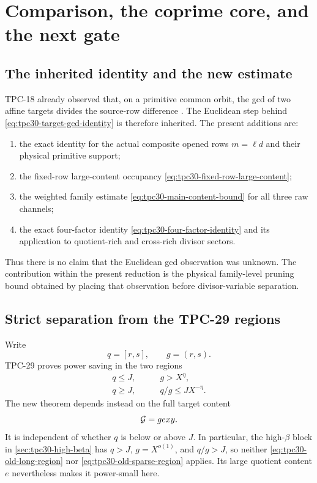 \section{Comparison, the coprime core, and the next gate}
\label{sec:tpc30-comparison}

\subsection{The inherited identity and the new estimate}

TPC-18 already observed that, on a primitive common orbit, the gcd of
two affine targets divides the source-row difference
\citep{WangTPC18}.  The Euclidean step behind
\eqref{eq:tpc30-target-gcd-identity} is therefore inherited.  The
present additions are:
\begin{enumerate}[label=\textup{(\roman*)}]
 \item the exact identity for the actual composite opened rows
 $m=\ell d$ and their physical primitive support;
 \item the fixed-row large-content occupancy
 \eqref{eq:tpc30-fixed-row-large-content};
 \item the weighted family estimate
 \eqref{eq:tpc30-main-content-bound} for all three raw channels;
 \item the exact four-factor identity
 \eqref{eq:tpc30-four-factor-identity} and its application to
 quotient-rich and cross-rich divisor sectors.
\end{enumerate}
Thus there is no claim that the Euclidean gcd observation was unknown.
The contribution within the present reduction is the physical
family-level pruning bound obtained by placing that observation before
divisor-variable separation.

\subsection{Strict separation from the TPC-29 regions}

Write
\[
 q=[r,s],\qquad g=(r,s).
\]
TPC-29 proves power saving in the two regions
\begin{align}
 q\le J,\qquad &g>X^\eta,
 \label{eq:tpc30-old-long-region}\\
 q\ge J,\qquad &q/g\le JX^{-\eta}.
 \label{eq:tpc30-old-sparse-region}
\end{align}
The new theorem depends instead on the full target content
\[
 \mathcal G=gexy.
\]
It is independent of whether $q$ is below or above $J$.  In
particular, the high-$\beta$ block in
\cref{sec:tpc30-high-beta} has $q>J$, $g=X^{o(1)}$, and $q/g>J$, so neither
\eqref{eq:tpc30-old-long-region} nor
\eqref{eq:tpc30-old-sparse-region} applies.  Its large quotient
content $e$ nevertheless makes it power-small here.

